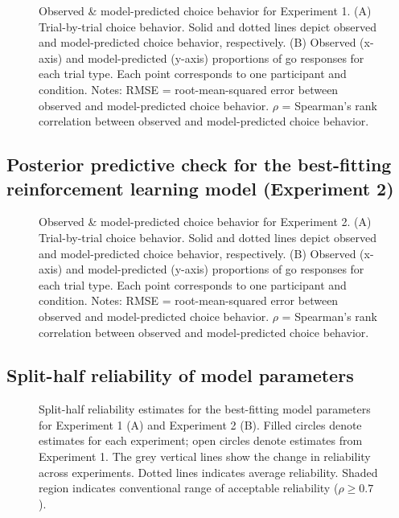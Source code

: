 \documentclass[a4paper,12pt]{article}
\begin{document}
\begin{refsection}[supp]
\begin{figure}[h]
    \centerline{}
    \caption{Observed \& model-predicted choice behavior for Experiment 1. (A) Trial-by-trial choice behavior. Solid and dotted lines depict observed and model-predicted choice behavior, respectively. (B) Observed (x-axis) and model-predicted (y-axis) proportions of go responses for each trial type. Each point corresponds to one participant and condition. Notes: RMSE = root-mean-squared error between observed and model-predicted choice behavior. $\rho$ = Spearman's rank correlation between observed and model-predicted choice behavior.}
    \label{fig:exp1_ppc}
\end{figure}

\clearpage
\subsection*{Posterior predictive check for the best-fitting reinforcement learning model (Experiment 2)}

\begin{figure}[h]
    \centerline{}
     \caption{Observed \& model-predicted choice behavior for Experiment 2. (A) Trial-by-trial choice behavior. Solid and dotted lines depict observed and model-predicted choice behavior, respectively. (B) Observed (x-axis) and model-predicted (y-axis) proportions of go responses for each trial type. Each point corresponds to one participant and condition. Notes: RMSE = root-mean-squared error between observed and model-predicted choice behavior. $\rho$ = Spearman's rank correlation between observed and model-predicted choice behavior.}
    \label{fig:exp2_ppc}
\end{figure}

\clearpage
\subsection*{Split-half reliability of model parameters}

\begin{figure}[h]
    \centerline{}
    \caption{Split-half reliability estimates for the best-fitting model parameters for Experiment 1 (A) and Experiment 2 (B). Filled circles denote estimates for each experiment; open circles denote estimates from Experiment 1. The grey vertical lines show the change in reliability across experiments. Dotted lines indicates average reliability. Shaded region indicates conventional range of acceptable reliability ($\rho \geq 0.7$).}
    \label{fig:figS04}
\end{figure}


\end{refsection}
\end{document}
